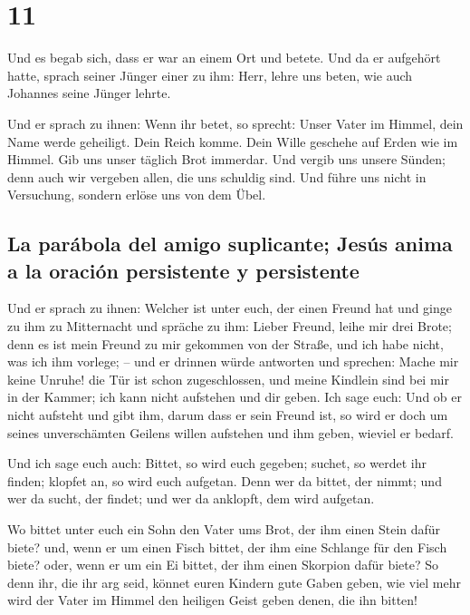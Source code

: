 \hypertarget{section-10}{%
\section{11}\label{section-10}}

 Und es begab sich, dass er war an einem Ort und betete.
Und da er aufgehört hatte, sprach seiner Jünger einer zu ihm: Herr,
lehre uns beten, wie auch Johannes seine Jünger lehrte.

 Und er sprach zu ihnen: Wenn ihr betet, so sprecht: Unser
Vater im Himmel, dein Name werde geheiligt. Dein Reich komme. Dein Wille
geschehe auf Erden wie im Himmel.  Gib uns unser täglich
Brot immerdar.  Und vergib uns unsere Sünden; denn auch
wir vergeben allen, die uns schuldig sind. Und führe uns nicht in
Versuchung, sondern erlöse uns von dem Übel.

\hypertarget{la-paruxe1bola-del-amigo-suplicante-jesuxfas-anima-a-la-oraciuxf3n-persistente-y-persistente}{%
\subsection{La parábola del amigo suplicante; Jesús anima a la oración
persistente y
persistente}\label{la-paruxe1bola-del-amigo-suplicante-jesuxfas-anima-a-la-oraciuxf3n-persistente-y-persistente}}

 Und er sprach zu ihnen: Welcher ist unter euch, der einen
Freund hat und ginge zu ihm zu Mitternacht und spräche zu ihm: Lieber
Freund, leihe mir drei Brote;  denn es ist mein Freund zu
mir gekommen von der Straße, und ich habe nicht, was ich ihm vorlege; --
 und er drinnen würde antworten und sprechen: Mache mir
keine Unruhe! die Tür ist schon zugeschlossen, und meine Kindlein sind
bei mir in der Kammer; ich kann nicht aufstehen und dir geben.
 Ich sage euch: Und ob er nicht aufsteht und gibt ihm,
darum dass er sein Freund ist, so wird er doch um seines unverschämten
Geilens willen aufstehen und ihm geben, wieviel er bedarf.

 Und ich sage euch auch: Bittet, so wird euch gegeben;
suchet, so werdet ihr finden; klopfet an, so wird euch aufgetan.
 Denn wer da bittet, der nimmt; und wer da sucht, der
findet; und wer da anklopft, dem wird aufgetan.

 Wo bittet unter euch ein Sohn den Vater ums Brot, der
ihm einen Stein dafür biete? und, wenn er um einen Fisch bittet, der ihm
eine Schlange für den Fisch biete?  oder, wenn er um ein
Ei bittet, der ihm einen Skorpion dafür biete?  So denn
ihr, die ihr arg seid, könnet euren Kindern gute Gaben geben, wie viel
mehr wird der Vater im Himmel den heiligen Geist geben denen, die ihn
bitten!

